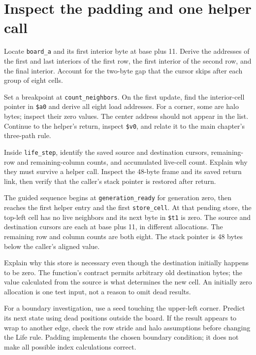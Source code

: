 \section{Inspect the padding and one helper call}

Locate \texttt{board\_a} and its first interior byte at base plus 11. Derive the
addresses of the first and last interiors of the first row, the first interior
of the second row, and the final interior. Account for the two-byte gap that the
cursor skips after each group of eight cells.

Set a breakpoint at \texttt{count\_neighbors}. On the first update, find the
interior-cell pointer in \texttt{\$a0} and derive all eight load addresses. For a
corner, some are halo bytes; inspect their zero values. The center address should
not appear in the list. Continue to the helper's return, inspect \texttt{\$v0},
and relate it to the main chapter's three-path rule.

Inside \texttt{life\_step}, identify the saved source and destination cursors,
remaining-row and remaining-column counts, and accumulated live-cell count. Explain
why they must survive a helper call. Inspect the 48-byte frame and its saved return
link, then verify that the caller's stack pointer is restored after return.

The guided sequence begins at \texttt{generation\_ready} for generation zero,
then reaches the first helper entry and the first \texttt{store\_cell}. At that
pending store, the top-left cell has no live neighbors and its next byte in
\texttt{\$t1} is zero. The source and destination cursors are each at base plus
11, in different allocations. The remaining row and column counts are both
eight. The stack pointer is 48 bytes below the caller's aligned value.

Explain why this store is necessary even though the destination initially happens
to be zero. The function's contract permits arbitrary old destination bytes;
the value calculated from the source is what determines the new cell. An
initially zero allocation is one test input, not a reason to omit dead results.

For a boundary investigation, use a seed touching the upper-left corner. Predict
its next state using dead positions outside the board. If the result appears to
wrap to another edge, check the row stride and halo assumptions before changing
the Life rule. Padding implements the chosen boundary condition; it does not make
all possible index calculations correct.

